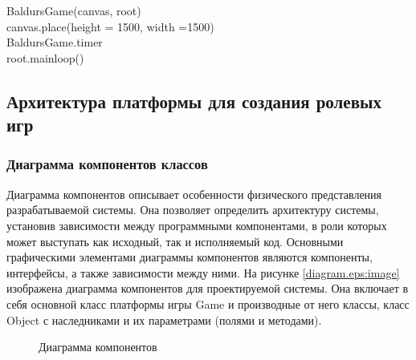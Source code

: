 BaldursGame(canvas, root)\\

canvas.place(height = 1500, width =1500)\\
BaldursGame.timer\\

root.mainloop()

\subsection{Архитектура платформы для создания ролевых игр}
\subsubsection{Диаграмма компонентов классов}
Диаграмма компонентов описывает особенности физического представления разрабатываемой системы. Она позволяет определить архитектуру системы, установив зависимости между программными компонентами, в роли которых может выступать как исходный, так и исполняемый код. Основными графическими элементами диаграммы компонентов являются компоненты, интерфейсы, а также зависимости между ними. На рисунке \ref{diagram.eps:image} изображена диаграмма компонентов для проектируемой системы. Она включает в себя основной класс платформы игры Game и производные от него классы, класс Object с наследниками и их параметрами (полями и методами).
\begin{figure}[ht]
	\caption{Диаграмма компонентов}
	\label{diagram:image}
\end{figure}

